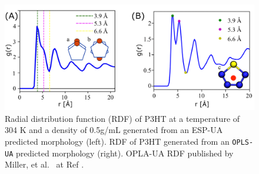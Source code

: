 \begin{figure}[hbt!]
    \centering
    \includegraphics[width=1\textwidth]{src/figures/FF_figs/p3ht_rdf.png} %
    \caption{Radial distribution function (RDF) of P3HT at a temperature of 304 K and a density of 0.5g/mL generated from an ESP-UA predicted morphology (left). RDF of P3HT generated from an \texttt{OPLS-UA} predicted morphology (right). OPLA-UA RDF published by Miller, et al.~ at Ref \citep{miller_optimization_2018}.}
    \label{P3HT RDF}
\end{figure}

